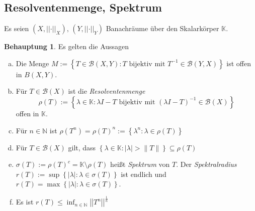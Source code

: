 \documentclass[ngerman]{article}
\theoremstyle{definition}%
\newtheorem*{beh}{Behauptung}
\newcommand{\N}{\mathbb{N}}
\newcommand{\K}{\mathbb{K}}
\newcommand{\B}{\mathcal{B}} %
\newcommand{\abs}[1]{\left\lvert #1 \right\rvert }
\newcommand{\norm}[1]{\left\lvert \left\lvert #1 \right\rvert \right\rvert}
\renewcommand{\{ }{\left\lbrace}
\renewcommand{\}}{\right\rbrace}
\begin{document}
\subsection{Resolventenmenge, Spektrum}
Es seien $(X,\norm{\cdot }_X),\, (Y,\norm{\cdot }_Y)$ Banachräume über den Skalarkörper $\K$. 
\begin{beh}
Es gelten die Aussagen
	\begin{enumerate}[(a)]
	\item Die Menge $M:=\{T\in \B(X,Y) : T \text{ bijektiv mit } T^{-1} \in \B(Y,X)\}$ ist offen in $B(X,Y)$.
	
	\item Für $T\in \B(X)$ ist die \textit{Resolventenmenge} 
	$$\rho(T):=\{ \lambda \in \K : \lambda I - T \text{ bijektiv mit } (\lambda I - T)^{-1}  \in \B(X)\}$$ 
	offen in $\K$.
	
	\item Für $n\in\N$ ist $\rho(T^n) = \rho(T)^n:=\{ \lambda^n : \lambda \in \rho(T)\} $
	
	\item Für $T \in \B(X)$ gilt, dass $\{ \lambda \in \K : \abs{\lambda} > \| T\| \} \subseteq \rho(T)$
		
	\item $\sigma(T) := \rho(T)^c = \K\setminus \rho(T)$ heißt \textit{Spektrum} von $T$. Der \textit{Spektralradius}
	$r(T):= \sup \{ \abs{\lambda} : \lambda \in \sigma(T) \}$ ist endlich und $r(T) = \max \{ \abs{\lambda} : \lambda \in \sigma(T) \} $.
	
	\item Es ist $r(T) \leq \inf_{n\in \N} \norm{T^n}^{\frac{1}{n}}$
	\end{enumerate}
\end{beh}
\end{document}
